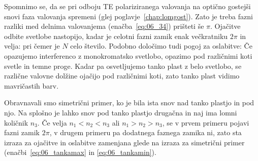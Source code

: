 Spomnimo se, da se pri odboju TE polariziranega valovanja na optično gostejši snovi
faza valovanja spremeni (glej poglavje~\ref{chap:lomgost}). Zato je treba
fazni razliki med delnima valovanjema (enačba~\ref{eq:06_34}) prišteti še $\pi$. Ojačitve
odbite svetlobe nastopijo, kadar je celotni fazni zamik enak večkratniku $2\pi$ in velja:
pri čemer je $N$ celo število. Podobno določimo tudi pogoj za oslabitve:
Če opazujemo interferenco z monokromatsko svetlobo,
opazimo pod različnimi koti svetle in temne proge. Kadar pa osvetljujemo tanko plast
z belo svetlobo, se različne valovne dolžine ojačijo pod različnimi koti, zato tanko
plast vidimo mavričastih barv.
\begin{remark}
Obravnavali smo simetrični primer, ko je bila ista snov nad tanko plastjo in pod njo.
Na splošno je lahko snov pod tanko plastjo drugačna in naj ima lomni količnik $n_3$. Če velja
$n_1 < n_2 <n_3$ ali $n_1 > n_2 > n_3$, se v prvem primeru pojavi fazni zamik $2\pi$,
v drugem primeru pa dodatnega faznega zamika ni, zato sta izraza za ojačitve in 
oslabitve zamenjana glede na izraza za simetrični primer (enačbi~\ref{eq:06_tankamax} in 
\ref{eq:06_tankamin}).
\end{remark}
